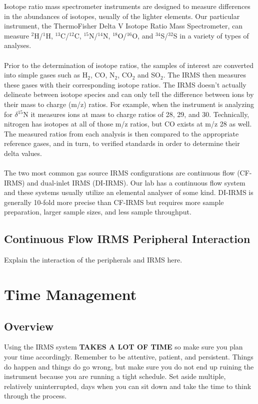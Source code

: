 \documentclass[12pt]{../SOP4_alpha}\usepackage[]{graphicx}\usepackage[]{color}
\begin{document}
\NP Isotope ratio mass spectrometer instruments are designed to measure differences in the abundances of isotopes, usually of the lighter elements. Our particular instrument, the ThermoFisher Delta V Isotope Ratio Mass Spectrometer, can measure $^{2}$H/$^{1}$H, $^{13}$C/$^{12}$C, $^{15}$N/$^{14}$N, $^{18}$O/$^{16}$O, and $^{34}$S/$^{32}$S in a variety of types of analyses.
\\
\\
Prior to the determination of isotope ratios, the samples of interest are converted into simple gases such as H$_2$, CO, N$_2$, CO$_2$ and SO$_2$. The IRMS then measures these gases with their corresponding isotope ratios. The IRMS doesn't actually delineate between isotope species and can only tell the difference between ions by their mass to charge (m/z) ratios. For example, when the instrument is analyzing for $\delta$$^{15}$N it measures ions at mass to charge ratios of 28, 29, and 30. Technically, nitrogen has isotopes at all of  those m/z ratios, but CO exists at m/z 28 as well. The measured ratios from each analysis is then compared to the appropriate reference gases, and in turn, to verified standards in order to determine their delta values.\\
\\
The two most common gas source IRMS configurations are continuous flow (CF-IRMS) and dual-inlet IRMS (DI-IRMS). Our lab has a continuous flow system and these systems usually utilize an elemental analyser of some kind. DI-IRMS is generally 10-fold more precise than CF-IRMS but requires more sample preparation, larger sample sizes, and less sample throughput.

\subsection{Continuous Flow IRMS Peripheral Interaction}

\NP Explain the interaction of the peripherals and IRMS here.

\section{Time Management}

\subsection{Overview}

\NP Using the IRMS system \textbf{TAKES A LOT OF TIME} so make sure you plan your time accordingly. Remember to be attentive, patient, and persistent. Things do happen and things do go wrong, but make sure you do not end up ruining the instrument because you are running a tight schedule. Set aside multiple, relatively uninterrupted, days when you can sit down and take the time to think through the process.
\end{document}

